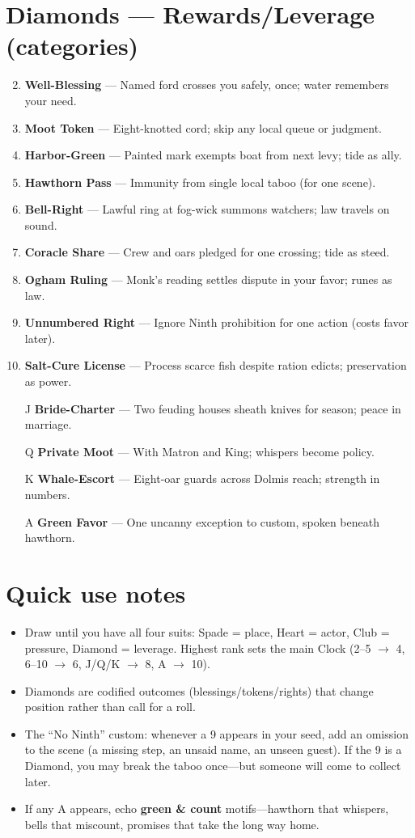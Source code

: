 \section*{Diamonds --- Rewards/Leverage (categories)}
\label{sec:theona-rewards}
\begin{enumerate}
\setcounter{enumi}{1}
\item \textbf{Well-Blessing} --- Named ford crosses you safely, once; water remembers your need.
\item \textbf{Moot Token} --- Eight-knotted cord; skip any local queue or judgment.
\item \textbf{Harbor-Green} --- Painted mark exempts boat from next levy; tide as ally.
\item \textbf{Hawthorn Pass} --- Immunity from single local taboo (for one scene).
\item \textbf{Bell-Right} --- Lawful ring at fog-wick summons watchers; law travels on sound.
\item \textbf{Coracle Share} --- Crew and oars pledged for one crossing; tide as steed.
\item \textbf{Ogham Ruling} --- Monk's reading settles dispute in your favor; runes as law.
\item \textbf{Unnumbered Right} --- Ignore Ninth prohibition for one action (costs favor later).
\item \textbf{Salt-Cure License} --- Process scarce fish despite ration edicts; preservation as power.
\item[J] \textbf{Bride-Charter} --- Two feuding houses sheath knives for season; peace in marriage.
\item[Q] \textbf{Private Moot} --- With Matron and King; whispers become policy.
\item[K] \textbf{Whale-Escort} --- Eight-oar guards across Dolmis reach; strength in numbers.
\item[A] \textbf{Green Favor} --- One uncanny exception to custom, spoken beneath hawthorn.
\end{enumerate}

\section*{Quick use notes}
\label{sec:theona-quick-use}
\begin{itemize}
\item Draw until you have all four suits: Spade = place, Heart = actor, Club = pressure, Diamond = leverage. Highest rank sets the main Clock (2--5 $\rightarrow$ 4, 6--10 $\rightarrow$ 6, J/Q/K $\rightarrow$ 8, A $\rightarrow$ 10).
\item Diamonds are codified outcomes (blessings/tokens/rights) that change position rather than call for a roll.
\item The ``No Ninth'' custom: whenever a 9 appears in your seed, add an omission to the scene (a missing step, an unsaid name, an unseen guest). If the 9 is a Diamond, you may break the taboo once---but someone will come to collect later.
\item If any A appears, echo \textbf{green \& count} motifs---hawthorn that whispers, bells that miscount, promises that take the long way home.
\end{itemize}

